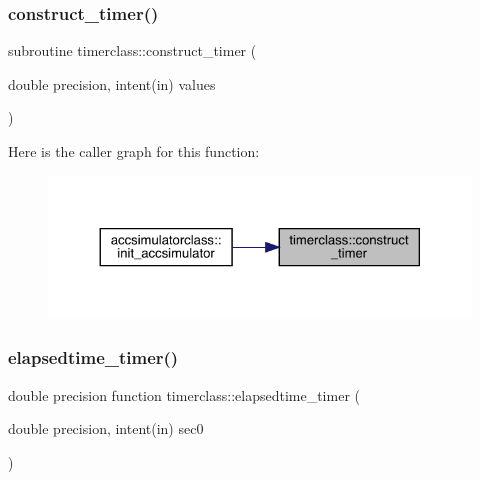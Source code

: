 \subsubsection{\texorpdfstring{construct\_timer()}{construct\_timer()}}
{\footnotesize\ttfamily subroutine timerclass\+::construct\+\_\+timer (\begin{DoxyParamCaption}\item[{double precision, intent(in)}]{values }\end{DoxyParamCaption})}

Here is the caller graph for this function\+:\nopagebreak
\begin{figure}[H]
\begin{center}
\leavevmode
\includegraphics[width=324pt]{namespacetimerclass_a162c9c59b952268a3b7b544cff4f4295_icgraph}
\end{center}
\end{figure}
\mbox{\label{namespacetimerclass_a3378d323d442f85aff95ab73cd13376d}} 
\subsubsection{\texorpdfstring{elapsedtime\_timer()}{elapsedtime\_timer()}}
{\footnotesize\ttfamily double precision function timerclass\+::elapsedtime\+\_\+timer (\begin{DoxyParamCaption}\item[{double precision, intent(in)}]{sec0 }\end{DoxyParamCaption})}

